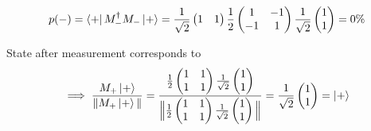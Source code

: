 \documentclass[a4paper, 12pt]{article}
\begin{document}
\begin{flushleft}
\[p(-)=\bra{+}M_{-}^{\dagger}M_{-}\ket{+} = \frac{1}{\sqrt{2}}\begin{pmatrix}
    1 & 1\\
\end{pmatrix} \frac{1}{2}\begin{pmatrix}
    1 & -1 \\
    -1 & 1 \\
\end{pmatrix} \frac{1}{\sqrt{2}} \begin{pmatrix}
    1 \\
    1 \\
\end{pmatrix} = 0\%\]

State after measurement corresponds to
\[\implies \frac{M_{+} \ket{+}}{\|M_{+} \ket{+}\|} = \frac{ \frac{1}{2}\begin{pmatrix}
    1 & 1\\
    1 & 1\\
\end{pmatrix} \frac{1}{\sqrt{2}}\begin{pmatrix}
    1 \\
    1 \\
\end{pmatrix}}{\Big\| \frac{1}{2}\begin{pmatrix}
    1 & 1\\
    1 & 1\\
\end{pmatrix} \frac{1}{\sqrt{2}}\begin{pmatrix}
    1 \\
    1 \\
\end{pmatrix}\Big\|}  = \frac{1}{\sqrt{2}}\begin{pmatrix}
    1 \\
    1 \\
\end{pmatrix} =\ket{+}\]
\end{flushleft}
\end{document}
